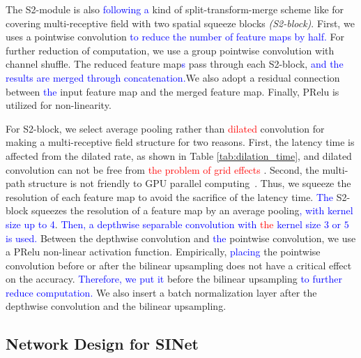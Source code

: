 \documentclass[10pt,twocolumn,letterpaper]{article}
\newcommand\Lars[1]{\textcolor{blue}{#1}}
\newcommand\nj[1]{\textcolor{red}{#1}}
\newcommand\Lars[1]{#1}
\newcommand\nj[1]{#1}
\begin{document}
The S2-module is also \Lars{following a} kind of split-transform-merge scheme like \cite{mehta2018espnet, mehta2018espnetv2, park2018concentrated} for covering multi-receptive field with two spatial squeeze blocks \textit{(S2-block)}.
First, we uses a pointwise convolution \Lars{to reduce the number of feature maps by half.}
For further reduction of computation, we use a group pointwise convolution with channel shuffle.
The reduced feature map\Lars{s} pass through each S2-block, \Lars{and the results are merged through concatenation.}We also adopt a residual connection between \Lars{the} input feature map and the merged feature map.
Finally, PRelu is utilized for non-linearity.

For S2-block, we select average pooling rather than \nj{dilated} convolution for making a multi-receptive field structure for two reasons.
First, the latency time is affected from the dilated rate, as shown in Table \ref{tab:dilation_time}, and dilated convolution can not be free from \nj{the problem of grid effects} \cite{park2018concentrated, wang2017understanding}.
Second, the multi-path structure is not friendly to GPU parallel computing~\cite{ma2018shufflenet}. 
Thus, we squeeze the resolution of each feature map to avoid the sacrifice of the latency time. 
\Lars{The} S2-block squeezes the resolution of a feature map by an average pooling\Lars{, with kernel size up to 4}.
\Lars{Then, a depthwise separable convolution with \nj{the} kernel size $3$ or $5$ is used. }
Between the depthwise convolution and \Lars{the} pointwise convolution, we use a PRelu non-linear activation function.
Empirically, \Lars{placing} the pointwise convolution before or after the bilinear upsampling does not have a critical effect on the accuracy.
\Lars{Therefore, we put it }before the bilinear upsampling \Lars{to further reduce computation. }We also insert a batch normalization layer after the depthwise convolution and the bilinear upsampling.











 
\subsection{Network Design for SINet}
\label{SINet}
\end{document}
